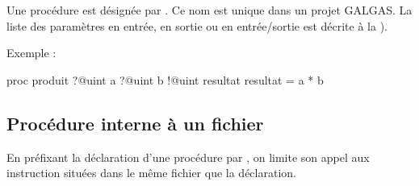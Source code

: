Une procédure est désignée par . Ce nom est unique dans un projet GALGAS. La liste des paramètres en entrée, en sortie ou en entrée/sortie est décrite à la ).

Exemple :

\begin{galgascode}
proc produit ?@uint a ?@uint b !@uint resultat {
  resultat = a * b
}
\end{galgascode}



\subsection{Procédure interne à un fichier}

En préfixant la déclaration d'une procédure par , on limite son appel aux instruction situées dans le même fichier que la déclaration.



